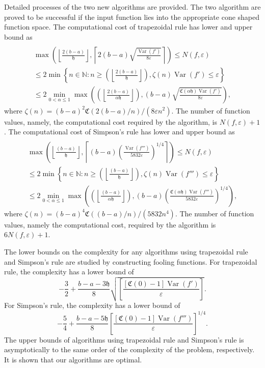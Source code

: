 \documentclass{iitthesis}
\DeclareMathOperator{\Var}{Var}
\theoremstyle{definition}
\theoremstyle{remark}
\begin{document}
Detailed processes of the two new algorithms are provided. The two algorithm are proved to be successful if the input function lies into the appropriate cone shaped function space. The computational cost of trapezoidal rule has lower and upper bound as
\begin{multline*}\\
        \max\left(\left\lfloor\frac{2(b-a)}{\mathfrak{h}}\right\rfloor,\left\lceil2(b-a)\sqrt{\frac{\Var(f')}{8\varepsilon}}\right\rceil\right)\leq N(f,\varepsilon)\\ \leq 2\min\left\{n\in\mathbb{N}:n\geq\left(\left\lfloor\frac{2(b-a)}{\mathfrak{h}}\right\rfloor\right),\zeta(n)\Var(f')\leq\varepsilon\right\}\\ \leq 2\min_{0<\alpha\leq1}\max\left(\left(\left\lfloor\frac{2(b-a)}{\alpha\mathfrak{h}}\right\rfloor\right),(b-a)\sqrt{\frac{\mathfrak{C}(\alpha\mathfrak{h})\Var(f')}{8\varepsilon}}\right),
    \end{multline*}
    where $\zeta(n)=(b-a)^2\mathfrak{C}(2(b-a)/n)/(8\varepsilon n^2)$. The number of function values, namely, the computational cost required by the algorithm, is $N(f,\varepsilon)+1$.
    The computational cost of Simpson's rule has lower and upper bound as
    \begin{multline*}\\
         \max\left(\left\lfloor\frac{(b-a)}{\mathfrak{h}}\right\rfloor,\left\lceil(b-a)\left(\frac{\Var(f''')}{5832\varepsilon}\right)^{1/4}\right\rceil\right)\leq N(f,\varepsilon)\\ \leq 2\min\left\{n\in\mathbb{N}:n\geq\left(\left\lfloor\frac{(b-a)}{\mathfrak{h}}\right\rfloor\right),\zeta(n)\Var(f''')\leq\varepsilon\right\}\\ \leq 2\min_{0<\alpha\leq1}\max\left(\left(\left\lfloor\frac{(b-a)}{\alpha\mathfrak{h}}\right\rfloor\right),(b-a)\left(\frac{\mathfrak{C}(\alpha\mathfrak{h})\Var(f''')}{5832\varepsilon}\right)^{1/4}\right),
    \end{multline*}
  where $\zeta(n)=(b-a)^4\mathfrak{C}((b-a)/n)/(5832n^4)$. The number of function values, namely the computational cost, required by the algorithm is $6N(f,\varepsilon)+1$.

The lower bounds on the complexity for any algorithms using trapezoidal rule and Simpson's rule are studied by constructing fooling functions. For trapezoidal rule, the complexity has a lower bound of
$$
     -\frac{3}{2}+\frac{b-a-3\mathfrak{h}}{8}\sqrt{\left[\frac{[\mathfrak{C}(0)-1]\Var( f')}{\varepsilon}\right]}.
$$
For Simpson's rule, the complexity has a lower bound of
$$
     -\frac{5}{4}+\frac{b-a-5\mathfrak{h}}{8}\left[\frac{[\mathfrak{C}(0)-1]\Var( f''')}{\varepsilon}\right]^{1/4}.
$$
The upper bounds of algorithms using trapezoidal rule and Simpson's rule is asymptotically to the same order of the complexity of the problem, respectively. It is shown that our algorithms are optimal.
\end{document}
